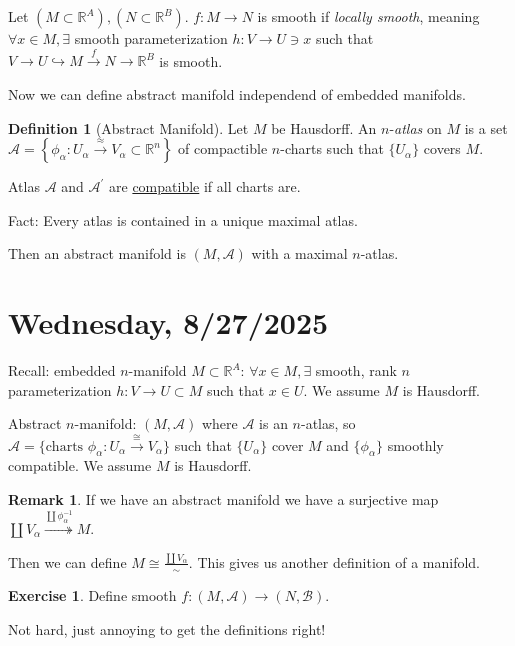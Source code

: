 \documentclass{article}
\theoremstyle{definition}
\newtheorem*{exercise}{Exercise}
\newtheorem*{definition}{Definition}
\newtheorem*{remark}{Remark}
\begin{document}
    Let \((M \subset \mathbb{R}^A), (N \subset \mathbb{R}^B)\). \(f: M \to N\) is smooth if \textit{locally smooth}, meaning \(\forall x\in M, \exists\) smooth parameterization \(h: V \to U \ni x\) such that \(V \to U \hookrightarrow M \xrightarrow{f} N \to \mathbb{R}^B\) is smooth.

    Now we can define abstract manifold independend of embedded manifolds.

    \begin{definition}
        [Abstract Manifold] Let \(M\) be Hausdorff. An \(n\)-\textit{atlas} on \(M\) is a set \(\mathcal{A}=\left\{ \phi_\alpha : U_\alpha \xrightarrow{\approx} V_\alpha \subset \mathbb{R}^n \right\}\) of compactible \(n\)-charts such that \(\{ U_\alpha \} \) covers \(M.\)

        Atlas \(\mathcal{A}\) and \(\mathcal{A}^{\prime}\) are \underline{compatible} if all charts are.

        Fact: Every atlas is contained in a unique maximal atlas.

        Then an abstract manifold is \((M,\mathcal{A})\) with a maximal \(n\)-atlas.
    \end{definition}

    \section*{Wednesday, 8/27/2025}
    
    Recall: embedded \(n\)-manifold \(M \subset \mathbb{R} ^ A\): \(\forall x\in M, \exists\) smooth, rank \(n\) parameterization \(h: V \to U \subset M\) such that \(x\in U\). We assume \(M\) is Hausdorff.

    Abstract \(n\)-manifold: \((M, \mathcal{A})\) where \(\mathcal{A}\) is an \(n\)-atlas, so \(\mathcal{A}  = \{ \text{charts } \phi_\alpha : U_\alpha \xrightarrow{\cong} V_\alpha \}\) such that \(\{ U_\alpha \}\) cover \(M\) and \(\{ \phi_\alpha \} \) smoothly compatible. We assume \(M\) is Hausdorff.
    
    \begin{remark}
        If we have an abstract manifold we have a surjective map \(\coprod V_\alpha \overset{\coprod \phi_\alpha ^{-1}}{\twoheadrightarrow} M\).
        
        Then we can define \(M \cong \frac{\coprod V_\alpha}{\sim}\). This gives us another definition of a manifold. 
    \end{remark}

    \begin{exercise}
        Define smooth \(f: (M,\mathcal{A}) \to (N,\mathcal{B})\).

        Not hard, just annoying to get the definitions right!
    \end{exercise}
\end{document}

